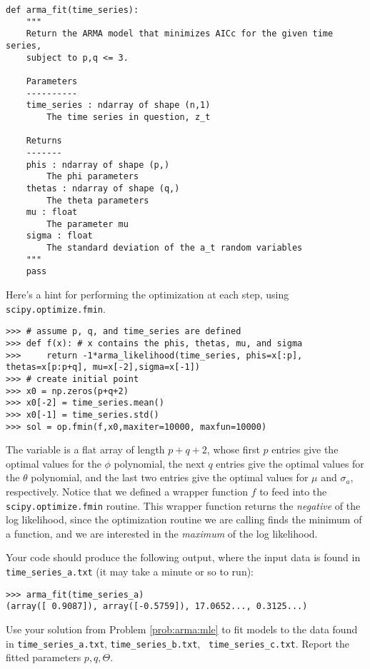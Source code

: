 \begin{lstlisting}
def arma_fit(time_series):
    """
    Return the ARMA model that minimizes AICc for the given time series,
    subject to p,q <= 3.

    Parameters
    ----------
    time_series : ndarray of shape (n,1)
        The time series in question, z_t

    Returns
    -------
    phis : ndarray of shape (p,)
        The phi parameters
    thetas : ndarray of shape (q,)
        The theta parameters
    mu : float
        The parameter mu
    sigma : float
        The standard deviation of the a_t random variables
    """
    pass
\end{lstlisting}
\vspace{3mm} \noindent
Here's a hint for performing the optimization at each step, using\\ {\tt scipy.optimize.fmin}.
\begin{lstlisting}
>>> # assume p, q, and time_series are defined
>>> def f(x): # x contains the phis, thetas, mu, and sigma
>>>     return -1*arma_likelihood(time_series, phis=x[:p], thetas=x[p:p+q], mu=x[-2],sigma=x[-1])
>>> # create initial point
>>> x0 = np.zeros(p+q+2)
>>> x0[-2] = time_series.mean()
>>> x0[-1] = time_series.std()
>>> sol = op.fmin(f,x0,maxiter=10000, maxfun=10000)
\end{lstlisting}
\vspace{3mm} \noindent
The variable  is a flat array of length $p+q+2$, whose first $p$ entries give the optimal values
for the $\phi$ polynomial, the next $q$ entries give the optimal values for the $\theta$ polynomial,
and the last two entries give the optimal values for $\mu$ and $\sigma_a$, respectively.
Notice that we defined a wrapper function $f$ to feed into the {\tt scipy.optimize.fmin} routine.
This wrapper function returns the \emph{negative} of the log likelihood, since the optimization routine we are
calling finds the minimum of a function, and we are interested in the \emph{maximum} of the log likelihood.

Your code should produce the following output, where the input data is found in
{\tt time\_series\_a.txt} (it may take a minute or so to run):
\begin{lstlisting}
>>> arma_fit(time_series_a)
(array([ 0.9087]), array([-0.5759]), 17.0652..., 0.3125...)
\end{lstlisting}

\label{prob:arma:data}
Use your solution from Problem \ref{prob:arma:mle} to fit models to the data
found in {\tt time\_series\_a.txt}, {\tt time\_series\_b.txt}, {\tt
time\_series\_c.txt}. Report the fitted parameters $p, q, \Theta$.

